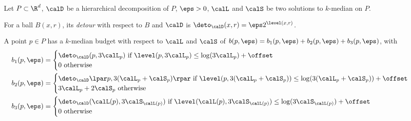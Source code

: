 \begin{definition}\label{def:budgetKmed}
Let $P\subset \R^d$, $\calD$ be 
a hierarchical decomposition of $P$, $\eps > 0$, $\calL$ and $\calS$ be two 
solutions to $k$-median on $P$. 

For a ball $B(x, r)$, its \emph{detour} with respect to $B$ and $\calD$ is $\deto_\calD(x, r) = \eps 2^{\level(x, r)}$.

A point $p\in P$ has a $k$-median budget with respect to $\calL$ and $\calS$ of $b(p, \eps) = b_1(p, \eps) + b_2(p, \eps) + b_3(p, \eps)$, with
\begin{align*}
    b_1(p, \eps) &= \begin{cases} 
 \deto_\calD(p, 3\calL_p)\text{ if } \level(p, 3\calL_p)\leq \log(3\calL_p) + \offset \\
  0\text{ otherwise }
\end{cases}
\\
b_2(p, \eps) &= \begin{cases} 
\deto_\calD\lpar p, 3(\calL_p + \calS_p)\rpar
 \text{ if } \level(p, 3(\calL_p + \calS_p))\leq \log(3(\calL_p + \calS_p)) + \offset \\
 3\calL_p + 2\calS_p \text{ otherwise }
\end{cases}
\\
b_3(p, \eps) &= \begin{cases} 
\deto_\calD(\calL(p),  3\calS_{\calL(p)})
 \text{ if } \level(\calL(p), 3\calS_{\calL(p)})\leq \log(3\calS_{\calL(p)}) + \offset \\
 0 \text{ otherwise }
\end{cases}
\end{align*}
\end{definition}

